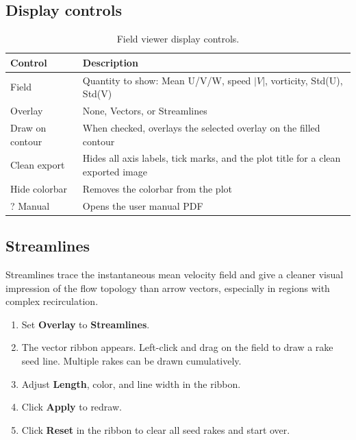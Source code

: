 \documentclass[11pt, a4paper]{report}
\newcommand{\uipth}[1]{\textbf{\textcolor{upblue}{#1}}}
\begin{document}
\subsection{Display controls}

\begin{table}[htbp]
\centering
\caption{Field viewer display controls.}
\begin{tabular}{lp{9cm}}
\toprule
\textbf{Control} & \textbf{Description} \\
\midrule
Field         & Quantity to show: Mean U/V/W, speed $|V|$, vorticity, Std(U), Std(V) \\
Overlay       & None, Vectors, or Streamlines \\
Draw on contour & When checked, overlays the selected overlay on the filled contour \\
Clean export  & Hides all axis labels, tick marks, and the plot title for a clean exported image \\
Hide colorbar & Removes the colorbar from the plot \\
? Manual      & Opens the user manual PDF \\
\bottomrule
\end{tabular}
\end{table}

\subsection{Streamlines}

Streamlines trace the instantaneous mean velocity field and give a cleaner visual impression of the flow topology than arrow vectors, especially in regions with complex recirculation.

\begin{stepbox}
\begin{enumerate}[leftmargin=1.5em, topsep=2pt]
  \item Set \uipth{Overlay} to \uipth{Streamlines}.
  \item The vector ribbon appears. Left-click and drag on the field to draw a rake seed line. Multiple rakes can be drawn cumulatively.
  \item Adjust \uipth{Length}, color, and line width in the ribbon.
  \item Click \uipth{Apply} to redraw.
  \item Click \uipth{Reset} in the ribbon to clear all seed rakes and start over.
\end{enumerate}
\end{stepbox}
\end{document}
